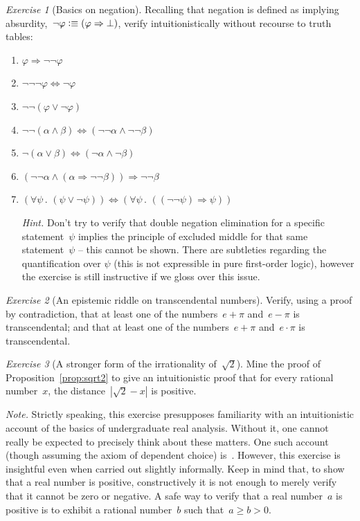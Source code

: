 \documentclass[10pt,reqno,a4paper,openany]{amsbook}
\theoremstyle{definition}
\theoremstyle{plain}
\theoremstyle{remark}
\newcommand{\?}{\,{:}\,}
\renewcommand{\_}{\mathpunct{.}\,}
\newcommand{\defequiv}{\vcentcolon\equiv}
\newtheorem{exercise}{Exercise}[chapter]
\begin{document}
\begin{exercise}[Basics on negation]
Recalling that negation is defined as implying absurdity,~$\neg\varphi
\defequiv (\varphi \Rightarrow \bot)$, verify intuitionistically without
recourse to truth tables:
\begin{enumerate}
\item $\varphi \Rightarrow \neg\neg\varphi$
\item $\neg\neg\neg\varphi \Leftrightarrow \neg\varphi$
\item $\neg\neg(\varphi \vee \neg\varphi)$
\item $\neg\neg(\alpha \wedge \beta) \Leftrightarrow (\neg\neg\alpha \wedge
\neg\neg\beta)$
\item $\neg(\alpha \vee \beta) \Longleftrightarrow (\neg\alpha \wedge \neg\beta)$
\item $(\neg\neg\alpha \wedge (\alpha \Rightarrow \neg\neg\beta)) \Longrightarrow
\neg\neg\beta$
\item $(\forall\psi\_ (\psi \vee \neg\psi))
\Longleftrightarrow (\forall\psi\_ ((\neg\neg\psi) \Rightarrow
\psi))$

{\noindent\scriptsize\emph{Hint.}
Don't try to verify that double negation elimination for a specific
statement~$\psi$ implies the principle of excluded middle for that same
statement~$\psi$ -- this cannot be shown. There are subtleties regarding the
quantification over $\psi$ (this is not expressible in pure first-order logic),
however the exercise is still instructive if we gloss over this issue.\par}
\end{enumerate}
\end{exercise}

\begin{exercise}[An epistemic riddle on transcendental numbers]
Verify, using a proof by contradiction, that at least one of the numbers~$e +
\pi$ and~$e - \pi$ is transcendental; and that at least one of the
numbers~$e + \pi$ and~$e \cdot \pi$ is transcendental.
\end{exercise}

\begin{exercise}[A stronger form of the irrationality of~$\sqrt{2}$]
\label{ex:sqrt2}
Mine the proof of Proposition~\ref{prop:sqrt2} to give an intuitionistic proof
that for every rational number~$x$, the distance~$|\sqrt{2}-x|$ is positive.

{\noindent\scriptsize\emph{Note.} Strictly speaking, this exercise presupposes
familiarity with an intuitionistic account of the basics of undergraduate real
analysis. Without it, one cannot really be expected to precisely think about
these matters. One such account (though assuming the axiom of dependent choice)
is~\cite{bishop-bridges:bible}. However, this exercise is insightful even when carried out
slightly informally. Keep in mind that, to show that a real number is positive,
constructively it is not enough to merely verify that it cannot be zero or
negative. A safe way to verify that a real number~$a$ is positive is to exhibit
a rational number~$b$ such that~$a \geq b > 0$.\par}
\end{exercise}
\end{document}
